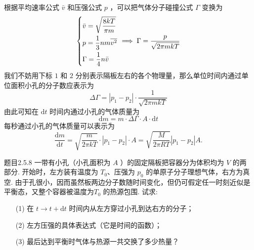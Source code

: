 \begin{solution}
    根据平均速率公式 $\bar{v}$ 和压强公式 $p$ ，可以把气体分子碰撞公式 $\Gamma$ 变换为
    $$
        \begin{dcases}
            \bar{v} = \sqrt{\frac{8kT}{\pi m}} \\
            p=\frac{1}{3}nm\overline{v^2}      \\
            \Gamma = \frac{1}{4} n \bar{v}
        \end{dcases}
        \implies \Gamma = \frac{p}{\sqrt{2\pi mkT}}
    $$
    我们不妨用下标 $1$ 和 $2$ 分别表示隔板左右的各个物理量，那么单位时间内通过单位面积小孔的分子数应表示为
    $$
        \Delta \Gamma = |p_1 - p_2| \cdot \frac{1}{\sqrt{2\pi mkT}}
    $$
    由此可知在 $\mathrm{d}t$ 时间内通过小孔的气体质量为
    $$
        \mathrm{d}m = m \cdot \Delta\Gamma \cdot A \cdot \mathrm{d}t
    $$
    每秒通过小孔的气体质量可以表示为
    $$
        \frac{\mathrm{d}m}{\mathrm{d}t} = \sqrt{\frac{m}{2\pi kT}} \cdot|p_1-p_2| \cdot A = \sqrt{\frac{M}{2\pi RT}} |p_1 - p_2| A.
    $$
\end{solution}

\begin{question}{题目2.5.8}
    一带有小孔（小孔面积为 $A$ ）的固定隔板把容器分为体积均为 $V$ 的两部分. 开始时，左方装有温度为 $T_0$、压强为 $p_0$ 的单原子分子理想气体，右方为真空. 由于孔很小，因而虽然板两边分子数随时间变化，但仍可假定任一时刻近似是平衡态，又整个容器被温度为$T_0$ 的热源包围. 试求:
    \begin{enumerate}
        \item[(1)] 在 $t \to t+\mathrm{d}t$ 时间内从左方穿过小孔到达右方的分子；
        \item[(2)] 左方压强的具体表达式（它是时间的函数）；
        \item[(3)] 最后达到平衡时气体与热源一共交换了多少热量？
    \end{enumerate}
\end{question}

